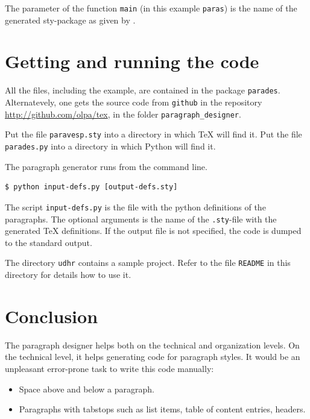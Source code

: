 \documentclass[]{ltugboat}
\begin{document}
The parameter of the function \verb|main| (in this example \verb|paras|) is the name of the generated sty-package as given by .


\section{Getting and running the code}

All the files, including the example, are contained in the  package \verb|parades|. Alternatevely, one gets the source code from \verb|github| in the repository \url{http://github.com/olpa/tex}, in the folder \verb|paragraph_designer|.

Put the file \verb|paravesp.sty| into a directory in which \TeX{} will find it. Put the file \verb|parades.py| into a directory in which Python will find it.

The paragraph generator runs from the command line.

\begin{verbatim}
$ python input-defs.py [output-defs.sty]
\end{verbatim}

The script \verb|input-defs.py| is the file with the python definitions of the paragraphs. The optional arguments is the name of the \verb|.sty|-file with the generated \TeX{} definitions. If the output file is not specified, the code is dumped to the standard output.

The directory \verb|udhr| contains a sample project. Refer to the file \verb|README| in this directory for details how to use it.

\section{Conclusion}

The paragraph designer helps both on the technical and organization levels.
On the technical level, it helps generating code for paragraph styles. It would be an unpleasant error-prone task to write this code manually:

\begin{itemize}
\item Space above and below a paragraph.
\item Paragraphs with tabstops such as list items, table of content entries, headers.
\end{itemize}
\end{document}
